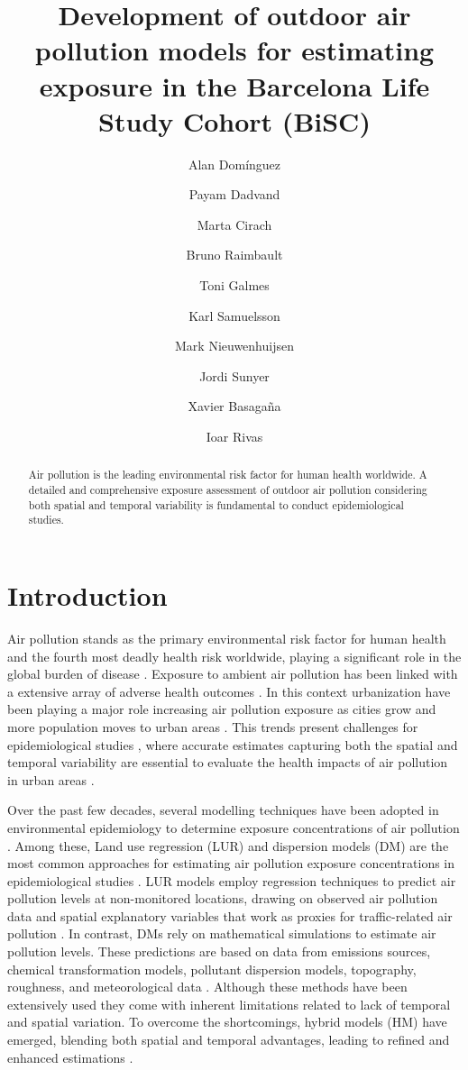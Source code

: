 \documentclass{article}
\title{Development of outdoor air pollution models for estimating exposure in the Barcelona Life Study Cohort (BiSC)}
\author[1, 2]{Alan Domínguez}
\author[1, 3, 4]{Payam Dadvand}
\author[1]{Marta Cirach}
\author[1]{Bruno Raimbault}
\author[1]{Toni Galmes}
\author[1]{Karl Samuelsson}
\author[1, 2, 3]{Mark Nieuwenhuijsen}
\author[1, 2, 3]{Jordi Sunyer}
\author[1, 2, 3]{Xavier Basagaña}
\author[1, 3]{Ioar Rivas}
\affil[1]{Barcelona Institute for Global Health (ISGlobal), Barcelona, Spain.}
\affil[2]{Universitat Popmpeu Fabra (UPF), Barcelona, Spain.}
\affil[3]{CIBER Epidemiología y Salud Pública (CIBERESP), Madrid, Spain.}
\affil[4]{London School of Hygiene and Tropical Medicine (LSHTM), London, UK.}
\begin{document}
\maketitle

\begin{abstract}

Air pollution is the leading environmental risk factor for human health worldwide. A detailed and comprehensive exposure assessment of outdoor air pollution considering both spatial and temporal variability is fundamental to conduct epidemiological studies.  

\end{abstract}

\section{Introduction}

Air pollution stands as the primary environmental risk factor for human health and the fourth most deadly health risk worldwide, playing a significant role in the global burden of disease \cite{cohen2017, he2020state}. Exposure to ambient air pollution has been linked with a extensive array of adverse health outcomes \cite{boogaard2022, guxens2022hei, haddad2023}. In this context urbanization have been playing a major role increasing air pollution exposure as cities grow and more population moves to urban areas \cite{nieuwenhuijsen2016}. This trends present challenges for epidemiological studies \cite{tonne2017}, where accurate estimates capturing both the spatial and temporal variability are essential to evaluate the health impacts of air pollution in urban areas \cite{boogaard2022}. 

Over the past few decades, several modelling techniques have been adopted in environmental epidemiology to determine exposure concentrations of air pollution \cite{hoek2017, di2019no2, di2019pm25, stafoggia2019, stafoggia2020}. Among these, Land use regression (LUR) and dispersion models (DM) are the most common approaches for estimating air pollution exposure concentrations in epidemiological studies \cite{gulliver2015, dehoogh2014}. LUR models employ regression techniques to predict air pollution levels at non-monitored locations, drawing on observed air pollution data and spatial explanatory variables that work as proxies for traffic-related air pollution \cite{briggs1997, hoek2008}. In contrast, DMs rely on mathematical simulations to estimate air pollution levels. These predictions are based on data from emissions sources, chemical transformation models, pollutant dispersion models, topography, roughness, and meteorological data \cite{hoek2017}. Although these methods have been extensively used they come with inherent limitations related to lack of temporal and spatial variation. To overcome the shortcomings, hybrid models (HM) have emerged, blending both spatial and temporal advantages, leading to refined and enhanced estimations \cite{hoek2017, korek2017, tularam2021, oh2021}. 
\end{document}
